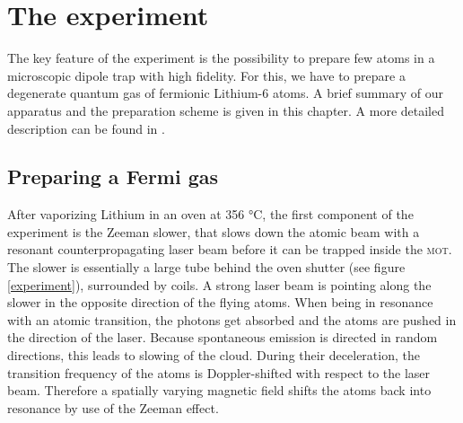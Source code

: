 \chapter{The experiment}


The key feature of the experiment is the possibility to prepare few atoms in a microscopic dipole trap with high fidelity. For this, we have to prepare a degenerate quantum gas of fermionic Lithium-6 atoms. A brief summary of our apparatus and the preparation scheme is given in this chapter. A more detailed description can be found in \cite{friedhelm}. 

\section{Preparing a Fermi gas}
After vaporizing Lithium in an oven at 356 °C, the first component of the experiment is the Zeeman slower, that slows down the atomic beam with a resonant counterpropagating laser beam before it can be trapped inside the \textsc{mot}. The slower is essentially a large tube behind the oven shutter (see figure \ref{experiment}), surrounded by coils. A strong laser beam is pointing along the slower in the opposite direction of the flying atoms. When being in resonance with an atomic transition, the photons get absorbed and the atoms are pushed in the direction of the laser. Because spontaneous emission is directed in random directions, this leads to slowing of the cloud. During their deceleration, the transition frequency of the atoms is Doppler-shifted with respect to the laser beam. Therefore a spatially varying magnetic field shifts the atoms back into resonance by use of the Zeeman effect. 
